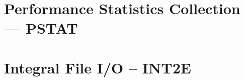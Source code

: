 \appendix
 

\chapter{Performance Statistics Collection --- PSTAT}


\chapter{Integral File I/O -- INT2E}



